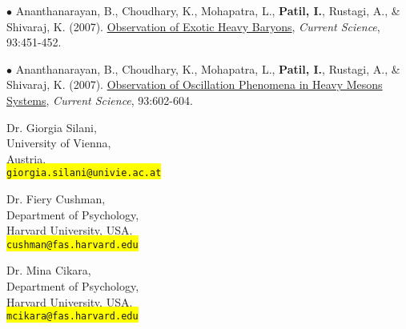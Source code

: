 \documentclass[10pt]{article}
\begin{document}
	$\bullet$ Ananthanarayan, B., Choudhary, K., Mohapatra, L., \textbf{Patil, I.}, Rustagi, A., \& Shivaraj, K. (2007). \hspace*{0.1in}\href{http://eprints.iisc.ernet.in/26860/1/current.pdf}{Observation of Exotic Heavy Baryons}, \textit{Current Science}, 93:451-452.
	\miniskip
	
	$\bullet$ Ananthanarayan, B., Choudhary, K., Mohapatra, L., \textbf{Patil, I.}, Rustagi, A., \& Shivaraj, K. (2007). \hspace*{0.1in}\href{http://eprints.iisc.ernet.in/15428/1/Observation_of_oscillation.pdf}{Observation of Oscillation Phenomena in Heavy Mesons Systems}, \textit{Current Science}, 93:602-604.
	\miniskip
	
	
	
	\parbox[c]{2.2in}{
	Dr. Giorgia Silani,\\
	University of Vienna,\\
	Austria.\\
	{\tt \colorbox{yellow}{giorgia.silani@univie.ac.at}}
	}
	\parbox[c]{2.2in}{
	Dr. Fiery Cushman,\\
	Department of Psychology,\\
	Harvard University, USA.\\
	{\tt \colorbox{yellow}{cushman@fas.harvard.edu}}
	}
	\parbox[c]{2.2in}{
	Dr. Mina Cikara,\\
	Department of Psychology,\\
	Harvard University, USA.\\
	{\tt \colorbox{yellow}{mcikara@fas.harvard.edu}}
	}
	
\end{document}
